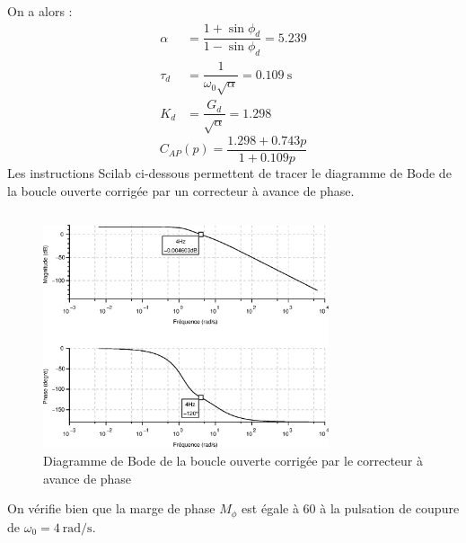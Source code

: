 On a alors :
\begin{align*}
    \alpha&=\dfrac{1+\sin\phi_d}{1-\sin\phi_d}=5.239 \\
    \tau_d&=\dfrac{1}{\omega_0\sqrt\alpha}=\SI{0.109}{\second}\\
       K_d&=\dfrac{G_d}{\sqrt\alpha}=1.298
\end{align*}
\[
C_{AP}(p)=\dfrac{1.298 + 0.743p } {1 + 0.109p}
\]
Les instructions Scilab ci-dessous permettent de tracer le diagramme 
de Bode de la boucle ouverte corrigée par un correcteur à avance de phase.
\inputminted{scilab}{codes/scilab/code_q8_chap_correction.sce}
\begin{figure}
    \centering
    \includegraphics[width=0.75\textwidth]{fig/chap_correction/bode_BOCAP.eps}
    \caption{Diagramme de Bode de la boucle ouverte corrigée par le correcteur
    à avance de phase}
\end{figure}
On vérifie bien que la marge de phase $M_\phi$ est égale à \SI{60}{\degreeSI}
à la pulsation de coupure de $\omega_0=\SI{4}{\radian\per\second}$.
